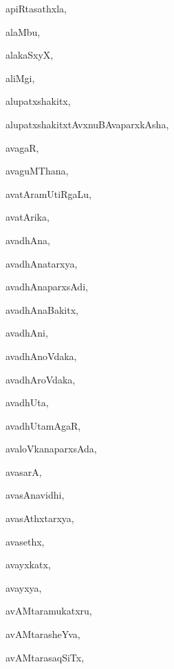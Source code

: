 \begin{multicols}{3}
{\noindent
{apiRtasathxla}, \pageref{apiRtasathxla}

\noindent
{alaMbu}, \pageref{alaMbu}

\noindent
{alakaSxyX}, \pageref{alakaSxyX}

\noindent
{aliMgi}, \pageref{aliMgi}

\noindent
{alupatxshakitx}, \pageref{alupatxshakitx}

\noindent
{alupatxshakitxtAvxnuBAvaparxkAsha}, \pageref{alupatxshakitxtAvxnuBAvaparxkAsha}

\noindent
{avagaR}, \pageref{avagaR}

\noindent
{avaguMThana}, \pageref{avaguMThana}

\noindent
{avatAramUtiRgaLu}, \pageref{avatAramUtiRgaLu}

\noindent
{avatArika}, \pageref{avatArika}

\noindent
{avadhAna}, \pageref{avadhAna}

\noindent
{avadhAnatarxya}, \pageref{avadhAnatarxya}

\noindent
{avadhAnaparxsAdi}, \pageref{avadhAnaparxsAdi}

\noindent
{avadhAnaBakitx}, \pageref{avadhAnaBakitx}

\noindent
{avadhAni}, \pageref{avadhAni}

\noindent
{avadhAnoVdaka}, \pageref{avadhAnoVdaka}

\noindent
{avadhAroVdaka}, \pageref{avadhAroVdaka}

\noindent
{avadhUta}, \pageref{avadhUta}

\noindent
{avadhUtamAgaR}, \pageref{avadhUtamAgaR}

\noindent
{avaloVkanaparxsAda}, \pageref{avaloVkanaparxsAda}

\noindent
{avasarA}, \pageref{avasarA}

\noindent
{avasAnavidhi}, \pageref{avasAnavidhi}

\noindent
{avasAthxtarxya}, \pageref{avasAthxtarxya}

\noindent
{avasethx}, \pageref{avasethx}

\noindent
{avayxkatx}, \pageref{avayxkatx}

\noindent
{avayxya}, \pageref{avayxya}

\noindent
{avAMtaramukatxru}, \pageref{avAMtaramukatxru}

\noindent
{avAMtarasheYva}, \pageref{avAMtarasheYva}

\noindent
{avAMtarasaqSiTx}, \pageref{avAMtarasaqSiTx}

}
\end{multicols}
